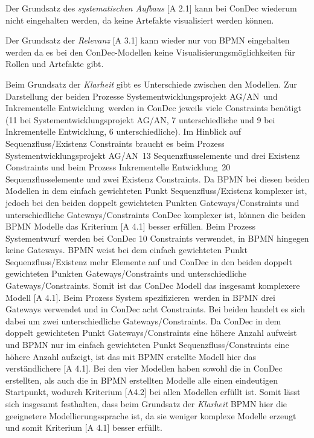 { 
Der  Grundsatz des \textit{systematischen Aufbaus} [A 2.1] kann bei ConDec wiederum nicht eingehalten werden, da keine Artefakte visualisiert werden können.\newline

Der Grundsatz der \textit{Relevanz} [A 3.1] kann wieder nur von BPMN eingehalten werden da es bei den ConDec-Modellen keine Visualisierungsmöglichkeiten für Rollen und Artefakte gibt.\newline


Beim Grundsatz der \textit{Klarheit} gibt es Unterschiede zwischen den Modellen. Zur Darstellung der beiden Prozesse \grqq Systementwicklungsprojekt AG/AN\grqq \ und \grqq Inkrementelle Entwicklung\grqq \ werden in ConDec jeweils viele Constraints benötigt (11 bei \grqq Systementwicklungsprojekt AG/AN\grqq, 7 unterschiedliche und 9 bei \grqq Inkrementelle Entwicklung\grqq, 6 unterschiedliche). Im Hinblick auf Sequenzfluss/Existenz Constraints braucht es beim Prozess \grqq Systementwicklungsprojekt AG/AN\grqq \ 13 Sequenzflusselemente und drei Existenz Constraints und beim Prozess \grqq Inkrementelle Entwicklung\grqq \ 20 Sequenzflusselemente und zwei Existenz Constraints. Da BPMN bei diesen beiden Modellen in dem einfach gewichteten Punkt Sequenzfluss/Existenz komplexer ist, jedoch bei den beiden doppelt gewichteten Punkten Gateways/Constraints und unterschiedliche Gateways/Constraints ConDec komplexer ist, können die beiden BPMN Modelle das Kriterium [A 4.1] besser erfüllen.\newline
Beim Prozess \grqq Systementwurf\grqq \ werden bei ConDec 10 Constraints verwendet, in BPMN hingegen keine Gateways. BPMN weist bei dem einfach gewichteten Punkt Sequenzfluss/Existenz mehr Elemente auf und ConDec in den beiden doppelt gewichteten Punkten Gateways/Constraints und unterschiedliche Gateways/Constraints. Somit ist das ConDec Modell das insgesamt komplexere Modell [A 4.1].\newline
Beim Prozess \grqq System spezifizieren\grqq \ werden in BPMN drei Gateways verwendet und in ConDec acht Constraints. Bei beiden handelt es sich dabei um zwei unterschiedliche Gateways/Constraints. Da ConDec in dem doppelt gewichteten Punkt Gateways/Constraints eine höhere Anzahl aufweist und BPMN nur im einfach gewichteten Punkt Sequenzfluss/Constraints eine höhere Anzahl aufzeigt, ist das mit BPMN erstellte Modell hier das verständlichere [A 4.1]. \newline
Bei den vier Modellen haben sowohl die in ConDec erstellten, als auch die in BPMN erstellten Modelle alle einen eindeutigen Startpunkt, wodurch Kriterium [A4.2] bei allen Modellen erfüllt ist.\newline
Somit lässt sich insgesamt festhalten, dass beim Grundsatz der \textit{Klarheit} BPMN hier die geeignetere Modellierungssprache ist, da sie weniger komplexe Modelle erzeugt und somit Kriterium [A 4.1] besser erfüllt.\newline

}
